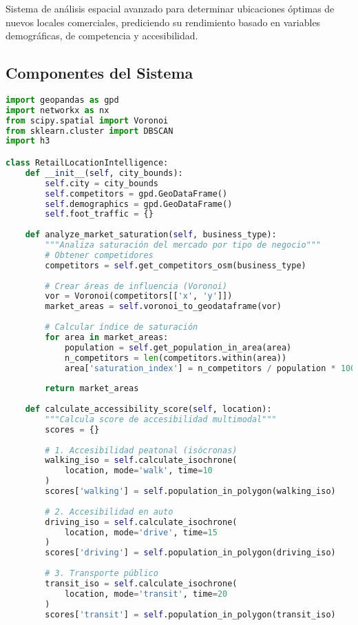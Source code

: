 \documentclass[12pt,a4paper]{article}
\begin{document}
Sistema de análisis espacial avanzado para determinar ubicaciones óptimas de nuevos locales comerciales, prediciendo su rendimiento basado en variables demográficas, de competencia y accesibilidad.

\subsection{Componentes del Sistema}

\begin{lstlisting}[language=Python, caption=Motor de análisis locacional]
import geopandas as gpd
import networkx as nx
from scipy.spatial import Voronoi
from sklearn.cluster import DBSCAN
import h3

class RetailLocationIntelligence:
    def __init__(self, city_bounds):
        self.city = city_bounds
        self.competitors = gpd.GeoDataFrame()
        self.demographics = gpd.GeoDataFrame()
        self.foot_traffic = {}
        
    def analyze_market_saturation(self, business_type):
        """Analiza saturación del mercado por tipo de negocio"""
        # Obtener competidores
        competitors = self.get_competitors_osm(business_type)
        
        # Crear áreas de influencia (Voronoi)
        vor = Voronoi(competitors[['x', 'y']])
        market_areas = self.voronoi_to_geodataframe(vor)
        
        # Calcular índice de saturación
        for area in market_areas:
            population = self.get_population_in_area(area)
            n_competitors = len(competitors.within(area))
            area['saturation_index'] = n_competitors / population * 1000
            
        return market_areas
    
    def calculate_accessibility_score(self, location):
        """Calcula score de accesibilidad multimodal"""
        scores = {}
        
        # 1. Accesibilidad peatonal (isócronas)
        walking_iso = self.calculate_isochrone(
            location, mode='walk', time=10
        )
        scores['walking'] = self.population_in_polygon(walking_iso)
        
        # 2. Accesibilidad en auto
        driving_iso = self.calculate_isochrone(
            location, mode='drive', time=15
        )
        scores['driving'] = self.population_in_polygon(driving_iso)
        
        # 3. Transporte público
        transit_iso = self.calculate_isochrone(
            location, mode='transit', time=20
        )
        scores['transit'] = self.population_in_polygon(transit_iso)
        

\end{lstlisting}
\end{document}
